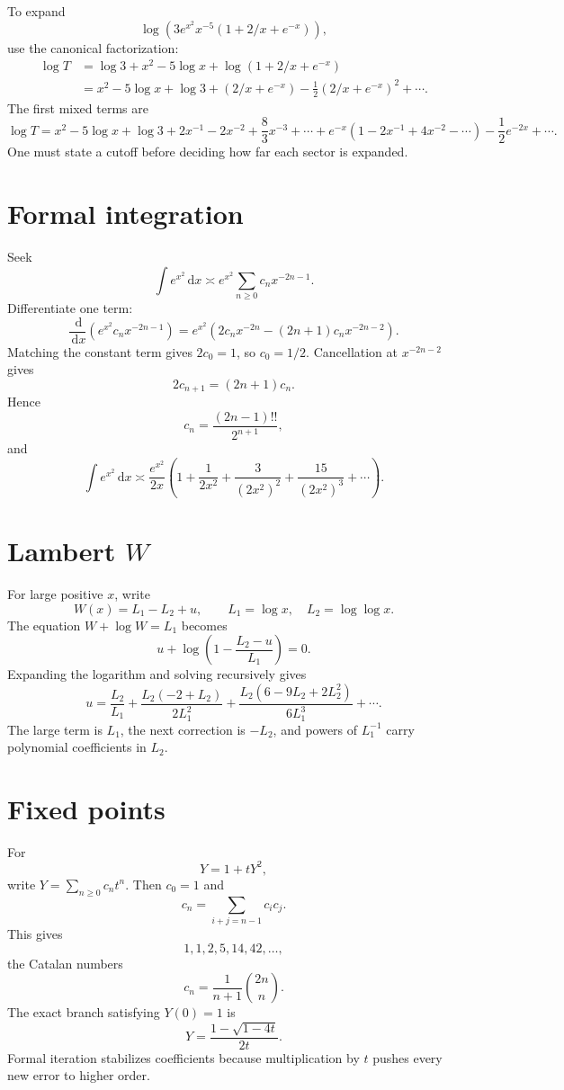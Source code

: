 \documentclass[11pt,openany]{book}
\theoremstyle{definition}
\theoremstyle{plain}
\theoremstyle{remark}
\newcommand{\dd}{\,\mathrm{d}}
\begin{document}
To expand
\[
 \log\left(3e^{x^2}x^{-5}(1+2/x+e^{-x})\right),
\]
use the canonical factorization:
\begin{align*}
 \log T
 &=\log3+x^2-5\log x
 +\log(1+2/x+e^{-x})\\
 &=x^2-5\log x+\log3
 +(2/x+e^{-x})
 -\frac12(2/x+e^{-x})^2+\cdots.
\end{align*}
The first mixed terms are
\[
 \log T=x^2-5\log x+\log3
 +2x^{-1}-2x^{-2}+\frac83x^{-3}+\cdots
 +e^{-x}(1-2x^{-1}+4x^{-2}-\cdots)
 -\frac12e^{-2x}+\cdots.
\]
One must state a cutoff before deciding how far each sector is expanded.

\section{Formal integration}

Seek
\[
 \int e^{x^2}\dd x
 \asymp e^{x^2}\sum_{n\ge0}c_nx^{-2n-1}.
\]
Differentiate one term:
\[
 \frac{\dd}{\dd x}
 \left(e^{x^2}c_nx^{-2n-1}\right)
 =e^{x^2}\left(2c_nx^{-2n}- (2n+1)c_nx^{-2n-2}\right).
\]
Matching the constant term gives $2c_0=1$, so $c_0=1/2$. Cancellation at $x^{-2n-2}$ gives
\[
 2c_{n+1}=(2n+1)c_n.
\]
Hence
\[
 c_n=\frac{(2n-1)!!}{2^{n+1}},
\]
and
\[
 \int e^{x^2}\dd x
 \asymp\frac{e^{x^2}}{2x}
 \left(1+\frac1{2x^2}+\frac3{(2x^2)^2}
 +\frac{15}{(2x^2)^3}+\cdots\right).
\]

\section{Lambert \texorpdfstring{$W$}{W}}

For large positive $x$, write
\[
 W(x)=L_1-L_2+u,
 \qquad
 L_1=\log x,
 \quad
 L_2=\log\log x.
\]
The equation $W+\log W=L_1$ becomes
\[
 u+\log\left(1-\frac{L_2-u}{L_1}\right)=0.
\]
Expanding the logarithm and solving recursively gives
\[
 u=\frac{L_2}{L_1}
 +\frac{L_2(-2+L_2)}{2L_1^2}
 +\frac{L_2(6-9L_2+2L_2^2)}{6L_1^3}
 +\cdots.
\]
The large term is $L_1$, the next correction is $-L_2$, and powers of $L_1^{-1}$ carry polynomial coefficients in $L_2$.

\section{Fixed points}

For
\[
 Y=1+tY^2,
\]
write $Y=\sum_{n\ge0}c_nt^n$. Then $c_0=1$ and
\[
 c_n=\sum_{i+j=n-1}c_ic_j.
\]
This gives
\[
 1,1,2,5,14,42,\dots,
\]
the Catalan numbers
\[
 c_n=\frac1{n+1}\binom{2n}{n}.
\]
The exact branch satisfying $Y(0)=1$ is
\[
 Y=\frac{1-\sqrt{1-4t}}{2t}.
\]
Formal iteration stabilizes coefficients because multiplication by $t$ pushes every new error to higher order.
\end{document}
